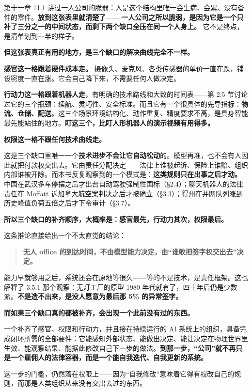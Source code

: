 \documentclass[11pt,a4paper]{ctexart}
\begin{document}
第十一章 11.1 讲过一人公司的脆弱：人是这个结构里唯一会生病、会累、没有备件的零件。\textbf{放到这张表里就清楚了——一人公司之所以脆弱，是因为它是一个只补了三分之一的中间状态，而剩下两个缺口全压在同一个人身上。} 它不是终点，是清单划到一半的样子。

\textbf{但这张表真正有用的地方，是三个缺口的解决曲线完全不一样。}

\textbf{感官这一格跟着硬件成本走。} 摄像头、麦克风、各类传感器的单价一直在跌，铺设密度一直在涨。它会自己降下来，不需要任何人做决定。

\textbf{行动力这一格跟着机器人走}，有明确的技术路线和大致的时间表——第 2.5 节讨论过它的三个瓶颈：续航、灵巧性、安全标准。而且它有一个很具体的先导指标：\textbf{物流、仓储、配送}。这三个场景环境结构化、动作重复、精度要求不高，是具身智能最先能站住的地方。\textbf{盯这三个，比盯人形机器人的演示视频有用得多。}

\textbf{权限这一格不跟任何技术曲线走。}

这是三个缺口里唯一一个\textbf{技术进步不会让它自动松动}的。模型再准，也不会有人因此就把付款权交出去。它由责任分配决定——法律上谁被起诉、保险上谁赔、组织内部谁被开除。而本书反复观察到的一个模式是：\textbf{这类规则只在出事之后才动。} 中国在武汉多车停摆之后才出台自动驾驶强制性国标（\S{}2.4）；聊天机器人的法律责任在 Moffatt 诉加拿大航空案判决之后才被确立（\S{}3.3）；得州在并网队列涨到历史峰值负荷五倍之后才下令审计（\S{}3.7）。

\textbf{所以三个缺口的补齐顺序，大概率是：感官最先，行动力其次，权限最后。}

这条推论直接给出一个不太直觉的结论：

\begin{quote}
\textbf{无人 office 的到达时间，不由模型能力决定，由“谁敢把签字权交出去”决定。}
\end{quote}

能力早就够用之后，系统还会在原地等很久——等的不是技术，是责任框架。这也解释了 3.5.1 那个观察：无灯工厂的原型 1980 年代就有了，四十年后仍是少数派。\textbf{不是造不出来，是没人愿意为最后那 5\% 的异常签字。}

\textbf{而如果三个缺口真的都被补齐，会出现一个此前没有过的东西。}

一个补齐了感官、权限和行动力，并且接在持续运行的 AI 系统上的组织，具备完成闭环所需的全部要件：它能感知外部状态、能做出决定、能让决定在物理世界里生效、能观察结果、能据此修改自己下一步的做法。\textbf{到那一步，“公司”就不再只是一个雇佣人的法律容器，而是一个能自我迭代、自我更新的系统。}

这一步的门槛，仍然落在权限上——因为“自我修改”意味着它得有权改自己的规则，而那是人类组织从来没有交出去过的东西。
\end{document}
